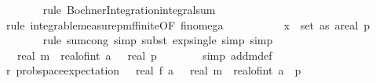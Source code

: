 \begin{isabellebody}
\ \ \ \ \ \ \isamarkupfalse%
\ {\isacharparenleft}{\kern0pt}rule\ Bochner{\isacharunderscore}{\kern0pt}Integration{\isachardot}{\kern0pt}integral{\isacharunderscore}{\kern0pt}sum{\isacharparenright}{\kern0pt}\isanewline
\ \ \ \ \ \ \isamarkupfalse%
\ {\isacharparenleft}{\kern0pt}rule\ integrable{\isacharunderscore}{\kern0pt}measure{\isacharunderscore}{\kern0pt}pmf{\isacharunderscore}{\kern0pt}finite{\isacharbrackleft}{\kern0pt}OF\ fin{\isacharunderscore}{\kern0pt}omega{\isacharunderscore}{\kern0pt}{}{\isacharbrackright}{\kern0pt}{\isacharparenright}{\kern0pt}\isanewline
\ \ \ \ \isamarkupfalse%
\ \isamarkupfalse%
\ {\isachardoublequoteopen}{\isachardot}{\kern0pt}{\isachardot}{\kern0pt}{\isachardot}{\kern0pt}\ {\isacharequal}{\kern0pt}\ {\isacharparenleft}{\kern0pt}{\isasymSum}\ x\ {\isasymin}\ set\ as{\isachardot}{\kern0pt}\ {\isacharparenleft}{\kern0pt}a{\isacharplus}{\kern0pt}{}{\isacharparenright}{\kern0pt}{\isacharslash}{\kern0pt}real\ p{\isacharparenright}{\kern0pt}{\isachardoublequoteclose}\isanewline
\ \ \ \ \ \ \isamarkupfalse%
\ {\isacharparenleft}{\kern0pt}rule\ sum{\isachardot}{\kern0pt}cong{\isacharcomma}{\kern0pt}\ simp{\isacharcomma}{\kern0pt}\ subst\ exp{\isacharunderscore}{\kern0pt}single{\isacharcomma}{\kern0pt}\ simp{\isacharcomma}{\kern0pt}\ simp{\isacharparenright}{\kern0pt}\isanewline
\ \ \ \ \isamarkupfalse%
\ \isamarkupfalse%
\ {\isachardoublequoteopen}{\isachardot}{\kern0pt}{\isachardot}{\kern0pt}{\isachardot}{\kern0pt}\ {\isacharequal}{\kern0pt}\ real\ m\ {\isacharasterisk}{\kern0pt}\ {\isacharparenleft}{\kern0pt}real{\isacharunderscore}{\kern0pt}of{\isacharunderscore}{\kern0pt}int\ a\ {\isacharplus}{\kern0pt}\ {}{\isacharparenright}{\kern0pt}\ {\isacharslash}{\kern0pt}real\ p{\isachardoublequoteclose}\isanewline
\ \ \ \ \ \ \isamarkupfalse%
\ {\isacharparenleft}{\kern0pt}simp\ add{\isacharcolon}{\kern0pt}m{\isacharunderscore}{\kern0pt}def{\isacharparenright}{\kern0pt}\isanewline
\ \ \ \ \isamarkupfalse%
\ \isamarkupfalse%
\ r{\isacharunderscore}{\kern0pt}{}{\isacharcolon}{\kern0pt}\ {\isachardoublequoteopen}prob{\isacharunderscore}{\kern0pt}space{\isachardot}{\kern0pt}expectation\ {\isasymOmega}\ {\isacharparenleft}{\kern0pt}{\isasymlambda}{\isasymomega}{\isachardot}{\kern0pt}\ real\ {\isacharparenleft}{\kern0pt}f\ a\ {\isasymomega}{\isacharparenright}{\kern0pt}{\isacharparenright}{\kern0pt}\ {\isacharequal}{\kern0pt}\ real\ m\ {\isacharasterisk}{\kern0pt}\ {\isacharparenleft}{\kern0pt}real{\isacharunderscore}{\kern0pt}of{\isacharunderscore}{\kern0pt}int\ a{\isacharplus}{\kern0pt}{}{\isacharparenright}{\kern0pt}\ {\isacharslash}{\kern0pt}\ p{\isachardoublequoteclose}\isanewline

\end{isabellebody}

